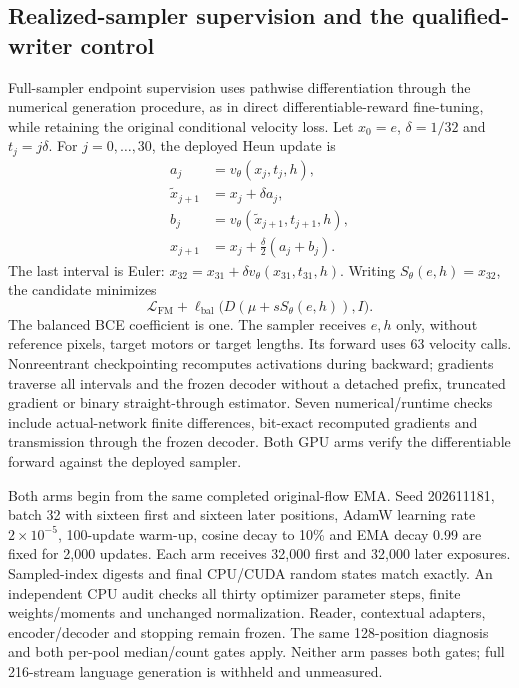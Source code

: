 \documentclass[12pt,a4paper]{article}
\providecommand{\DIFadd}[1]{{\protect\color{blue} \sf #1}} %
\begin{document}
\subsection*{\DIFadd{Realized-sampler supervision and the qualified-writer control}}
\DIFadd{Full-sampler endpoint supervision uses pathwise differentiation through the
numerical generation procedure, as in direct differentiable-reward
fine-tuning\cite{draft}, while retaining the original conditional velocity
loss\cite{flowmatching}. Let $x_0=e$, $\delta=1/32$ and $t_j=j\delta$.
For $j=0,\ldots,30$, the deployed Heun update is
}\begin{align}
 a_j&=v_\theta(x_j,t_j,h),\\
 \widetilde x_{j+1}&=x_j+\delta a_j,\\
 b_j&=v_\theta(\widetilde x_{j+1},t_{j+1},h),\\
 x_{j+1}&=x_j+\tfrac{\delta}{2}(a_j+b_j).
\end{align}
\DIFadd{The last interval is Euler: $x_{32}=x_{31}+\delta
v_\theta(x_{31},t_{31},h)$. Writing $S_\theta(e,h)=x_{32}$, the candidate
minimizes
}\[
 \mathcal L_\mathrm{FM}+\ell_\mathrm{bal}
 \bigl(D(\mu+sS_\theta(e,h)),I\bigr).
\]
\DIFadd{The balanced BCE coefficient is one. The sampler receives $e,h$ only, without
reference pixels, target motors or target lengths. Its forward uses 63
velocity calls. Nonreentrant checkpointing recomputes activations during
backward; gradients traverse all intervals and the frozen decoder without a
detached prefix, truncated gradient or binary straight-through estimator.
Seven numerical/runtime checks include actual-network finite differences,
bit-exact recomputed gradients and transmission through the frozen decoder.
Both GPU arms verify the differentiable forward against the deployed sampler.
}

\DIFadd{Both arms begin from the same completed original-flow EMA. Seed 202611181,
batch 32 with sixteen first and sixteen later positions, AdamW learning rate
$2\times10^{-5}$, 100-update warm-up, cosine decay to 10\% and EMA decay 0.99
are fixed for 2,000 updates. Each arm receives 32,000 first and 32,000 later
exposures. Sampled-index digests and final CPU/CUDA random states match exactly.
An independent CPU audit checks all thirty optimizer parameter steps, finite
weights/moments and unchanged normalization. Reader, contextual adapters,
encoder/decoder and stopping remain frozen. The same 128-position diagnosis
and both per-pool median/count gates apply. Neither arm passes both gates;
full 216-stream language generation is withheld and unmeasured.
}
\end{document}
